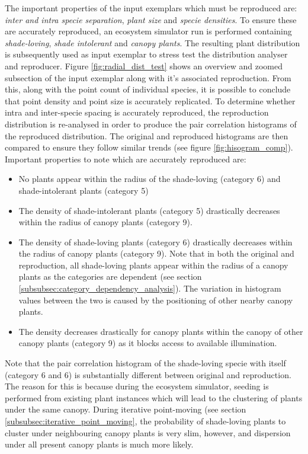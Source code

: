 The important properties of the input exemplars which must be reproduced are: \textit{inter and intra specie separation}, \textit{plant size} and \textit{specie densities}. To ensure these are accurately reproduced, an ecosystem simulator run is performed containing \textit{shade-loving}, \textit{shade intolerant} and \textit{canopy plants}. The resulting plant distribution is subsequently used as input exemplar to stress test the distribution analyser and reproducer. Figure \ref{fig:radial_dist_test} shows an overview and zoomed subsection of the input exemplar along with it's associated reproduction. From this, along with the point count of individual species, it is possible to conclude that point density and point size is accurately replicated. To determine whether intra and inter-specie spacing is accurately reproduced, the reproduction distribution is re-analysed in order to produce the pair correlation histograms of the reproduced distribution. The original and reproduced histograms are then compared to ensure they follow similar trends (see figure \ref{fig:hisogram_comp}). Important properties to note which are accurately reproduced are:
\begin{itemize}
\item No plants appear within the radius of the shade-loving (category 6) and shade-intolerant plants (category 5)
\item The density of shade-intolerant plants (category 5) drastically decreases within the radius of canopy plants (category 9).
\item The density of shade-loving plants (category 6) drastically decreases within the radius of canopy plants (category 9). Note that in both the original and reproduction, all shade-loving plants appear within the radius of a canopy plants as the categories are dependent (see section \ref{subsubsec:category_dependency_analysis}). The variation in histogram values between the two is caused by the positioning of other nearby canopy plants.
\item The density decreases drastically for canopy plants within the canopy of other canopy plants (category 9) as it blocks access to available illumination.
\end{itemize}

Note that the pair correlation histogram of the shade-loving specie with itself (category 6 and 6) is substantially different between original and reproduction. The reason for this is because during the ecosystem simulator, seeding is performed from existing plant instances which will lead to the clustering of plants under the same canopy. During iterative point-moving (see section \ref{subsubsec:iterative_point_moving}, the probability of shade-loving plants to cluster under neighbouring canopy plants is very slim, however, and dispersion under all present canopy plants is much more likely.


